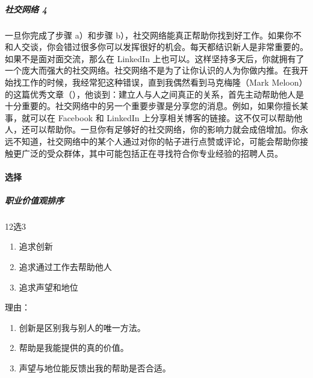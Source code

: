 \documentclass[letterpaper,10pt,english]{sphinxmanual}
\begin{document}
\subparagraph{社交网络 4\sphinxfootnotemark[830]}
\label{\detokenize{chapter_interview/xintai:id9}}%
\begin{footnotetext}[830]\sphinxAtStartFootnote
{}
%
\end{footnotetext}\ignorespaces 
一旦你完成了步骤 a）和步骤
b），社交网络能真正帮助你找到好工作。如果你不和人交谈，你会错过很多你可以发挥很好的机会。每天都结识新人是非常重要的。如果不是面对面交流，那么在
LinkedIn
上也可以。这样坚持多天后，你就拥有了一个庞大而强大的社交网络。社交网络不是为了让你认识的人为你做内推。在我开始找工作的时候，我经常犯这种错误，直到我偶然看到马克梅隆（Mark
Meloon）的这篇优秀文章（），他谈到：建立人与人之间真正的关系，首先主动帮助他人是十分重要的。社交网络中的另一个重要步骤是分享您的消息。例如，如果你擅长某事，就可以在
Facebook 和 LinkedIn
上分享相关博客的链接。这不仅可以帮助他人，还可以帮助你。一旦你有足够好的社交网络，你的影响力就会成倍增加。你永远不知道，社交网络中的某个人通过对你的帖子进行点赞或评论，可能会帮助你接触更广泛的受众群体，其中可能包括正在寻找符合你专业经验的招聘人员。


\paragraph{选择}
\label{\detokenize{chapter_interview/choose:id1}}\label{\detokenize{chapter_interview/choose::doc}}

\subparagraph{职业价值观排序}
\label{\detokenize{chapter_interview/choose:id2}}
12选3
%
\begin{footnote}[831]\sphinxAtStartFootnote
{}
%
\end{footnote}
\begin{enumerate}
%
\item {} 
追求创新

\item {} 
追求通过工作去帮助他人

\item {} 
追求声望和地位

\end{enumerate}

理由：
\begin{enumerate}
%
\item {} 
创新是区别我与别人的唯一方法。

\item {} 
帮助是我能提供的真的价值。

\item {} 
声望与地位能反馈出我的帮助是否合适。

\end{enumerate}
\end{document}
